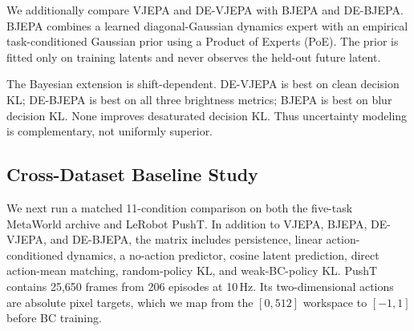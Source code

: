 \documentclass[10pt,twocolumn]{article}
\theoremstyle{tightstyle}
\begin{document}
We additionally compare VJEPA and DE-VJEPA with BJEPA and DE-BJEPA. BJEPA combines
a learned diagonal-Gaussian dynamics expert with an empirical task-conditioned
Gaussian prior using a Product of Experts (PoE). The prior is fitted only on
training latents and never observes the held-out future latent.

\begin{table}[t]
\centering
\caption{VJEPA/BJEPA comparison. Values are mean $\pm$ standard error across
30 task/source/evaluator units. Lower is better.}
\label{tab:bjepa-main}
\small
\setlength{\tabcolsep}{3pt}
\end{table}

The Bayesian extension is shift-dependent. DE-VJEPA is best on clean decision
KL; DE-BJEPA is best on all three brightness metrics; BJEPA is best on blur
decision KL. None improves desaturated decision KL. Thus uncertainty modeling is
complementary, not uniformly superior.

\subsection{Cross-Dataset Baseline Study}

We next run a matched 11-condition comparison on both the five-task MetaWorld
archive and LeRobot PushT. In addition to VJEPA, BJEPA, DE-VJEPA, and DE-BJEPA,
the matrix includes persistence, linear action-conditioned dynamics, a no-action
predictor, cosine latent prediction, direct action-mean matching, random-policy
KL, and weak-BC-policy KL. PushT contains 25,650 frames from 206 episodes at
10\,Hz. Its two-dimensional actions are absolute pixel targets, which we map from
the $[0,512]$ workspace to $[-1,1]$ before BC training.
\end{document}
